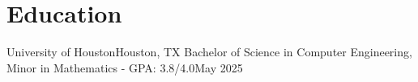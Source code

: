 \section{Education}
    \resumeSubHeadingListStart
    \resumeSubheading
    {University of Houston}{Houston, TX}
    {Bachelor of Science in Computer Engineering, Minor in Mathematics - GPA: 3.8/4.0}{May 2025}
  \resumeSubHeadingListEnd
